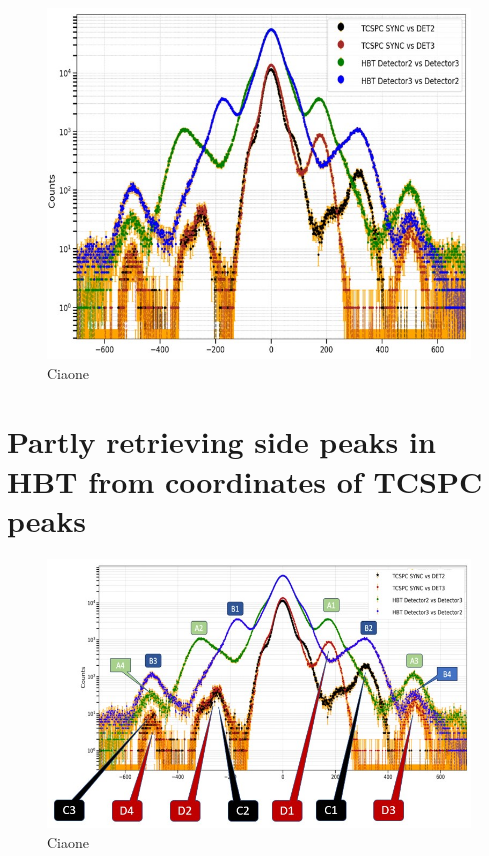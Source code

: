 \begin{figure}[hbtp]
\centering
\includegraphics[width=1\textwidth]{Khaos.jpg}
\caption{Ciaone}
\label{Khaos}
\end{figure}

\section{Partly retrieving side peaks in HBT from coordinates of TCSPC peaks}
\label{cpp:Reconstructsides}

\begin{figure}[hbtp]
\centering
\includegraphics[width=1\textwidth]{Khaos_Labeled.jpg}
\caption{Ciaone}
\label{Khaos_labeled}
\end{figure}


